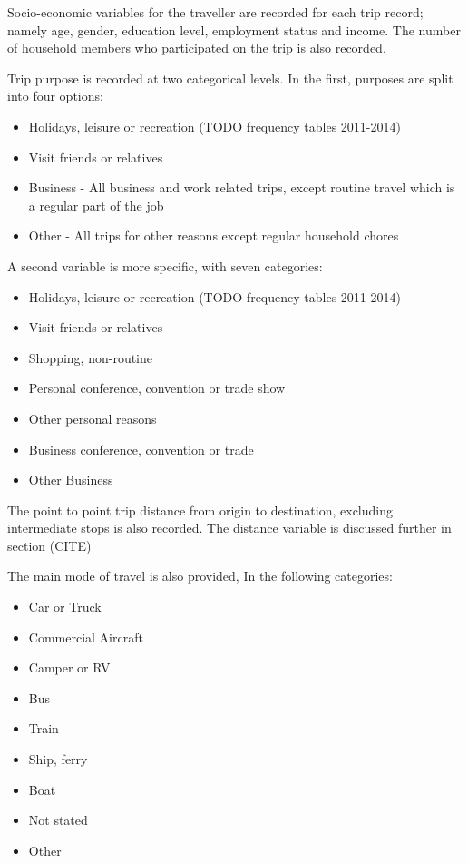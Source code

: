 Socio-economic variables for the traveller are recorded for each trip record; namely age, gender, education level, employment status and income. The number of household members who participated on the trip is also recorded.

Trip purpose is  recorded at two categorical levels. In the first, purposes are split into four options:
\begin{itemize}
\item Holidays, leisure or recreation (TODO frequency tables 2011-2014)
\item Visit friends or relatives
\item Business - All business and work related trips, except routine travel which is a regular part of the job
\item Other - All trips for other reasons except regular household chores
\end{itemize}

A second variable is more specific, with seven categories:
\begin{itemize}
\item Holidays, leisure or recreation (TODO frequency tables 2011-2014)
\item Visit friends or relatives
\item Shopping, non-routine
\item Personal conference, convention or trade show
\item Other personal reasons
\item Business conference, convention or trade
\item Other Business
\end{itemize}
The point to point trip distance from origin to destination, excluding intermediate stops is also recorded. The distance variable is discussed further in section (CITE) 

The main mode of travel is also provided, In the following categories:
\begin{itemize}
\item Car or Truck
\item Commercial Aircraft
\item Camper or RV
\item Bus
\item Train
\item Ship, ferry
\item Boat
\item Not stated
\item Other
\end{itemize}

